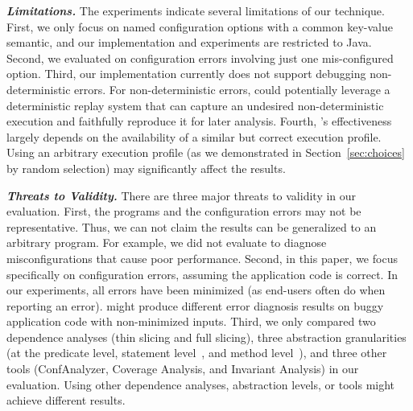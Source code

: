 

\noindent \textbf{\textit{Limitations.}} 
The experiments indicate several limitations of our technique. 
%
First, we only focus on named configuration options
with a common key-value semantic, and our implementation
and experiments are restricted to Java. 
%
Second, we evaluated \ourtool on configuration errors
involving just one mis-configured option.
%
Third,  our implementation currently does not
support debugging non-deterministic errors. 
For non-deterministic errors, \ourtool could potentially leverage 
a deterministic replay system
that can capture an undesired non-deterministic
execution and faithfully reproduce it for later analysis.
%
Fourth, \ourtool's effectiveness  largely
depends on the availability of a similar but correct execution profile.
Using an arbitrary execution profile (as we demonstrated in Section~\ref{sec:choices}
by random selection) may significantly affect the results.

\vspace{1mm}

\noindent \textbf{\textit{Threats to Validity.}} 
There are three major threats to validity in our evaluation. 
%
First, the \subjectnum programs and the configuration errors may not be
representative. Thus, we can not claim the results can be
generalized to an arbitrary program.
For example, we did not evaluate \ourtool to diagnose misconfigurations
that cause poor performance.
%
Second, in this paper, we focus specifically on
configuration errors, assuming the application code is correct.
In our experiments, all \errors errors
have been minimized (as end-users often do
when reporting an error). \ourtool might produce
different error diagnosis results on buggy application 
code with non-minimized inputs.
%
Third, we only compared two dependence
analyses (thin slicing and full slicing), three
abstraction granularities (at the predicate level,
statement level~\cite{Jones:2002}, and method level~\cite{Ernst:1999}),
and three other tools (ConfAnalyzer, Coverage Analysis, and
Invariant Analysis) in our evaluation.
 Using other dependence analyses, abstraction levels, or tools
might achieve different results.

